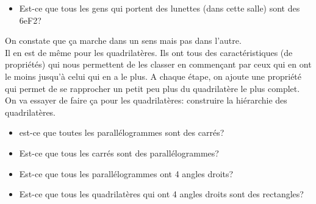 {\begin{activite}
\begin{itemize}
    \item Est-ce que tous les gens qui portent des \textcolor{G1}{lunettes} (dans cette salle) sont des \textcolor{G1}{6eF2}?
\end{itemize}
On constate que ça marche dans un sens mais pas dans l'autre.\\
\newline
Il en est de même pour les quadrilatères. Ils ont tous des caractéristiques (de propriétés) qui nous permettent de les classer en commençant par ceux qui en ont le moins jusqu’à celui qui en a le plus. A chaque étape, on ajoute une propriété qui permet de se rapprocher un petit peu plus du quadrilatère le plus complet.\\
\newline
On va essayer de faire ça pour les quadrilatères: construire la hiérarchie des quadrilatères.\\
\begin{itemize}
    \item est-ce que toutes les \textcolor{G1}{parallélogrammes} sont des \textcolor{G1}{carrés}?
    \item Est-ce que tous les \textcolor{G1}{carrés} sont des \textcolor{G1}{parallélogrammes}?
    \item Est-ce que tous les \textcolor{G1}{parallélogrammes} ont \textcolor{G1}{4 angles droits}?
    \item Est-ce que tous les quadrilatères qui ont \textcolor{G1}{4 angles droits} sont des \textcolor{G1}{rectangles}?
\end{itemize}

\end{activite}
}
 

